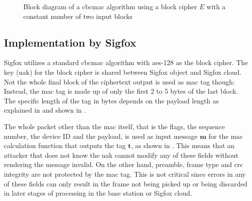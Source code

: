 \begin{figure}[h]
	\centering
	\caption{Block diagram of a \gls{cbcmac} algorithm using a block cipher $E$ with a constant number of two input blocks}
	\label{fig:cbcmac}
\end{figure}

\subsection{Implementation by Sigfox}
\label{sec:ul_mac_realization}
Sigfox utilizes a standard \gls{cbcmac} algorithm with \gls{aes}-128 as the block cipher.
The key (\gls{nak}) for the block cipher is shared between Sigfox object and Sigfox cloud.
Not the whole final block of the ciphertext output is used as \gls{mac} tag though: Instead, the \gls{mac} tag is made up of only the first 2 to 5 bytes of the last block.
The specific length of the tag in bytes depends on the payload length as explained in  and shown in .

The whole packet other than the \gls{mac} itself, that is the flags, the sequence number, the device ID and the payload, is used as input message $\mathbf m$ for the \gls{mac} calculation function that outputs the tag $\mathbf t$, as shown in .
This means that an attacker that does not know the \gls{nak} cannot modify any of these fields without rendering the message invalid.
On the other hand, preamble, frame type and \gls{crc} integrity are not protected by the \gls{mac} tag.
This is not critical since errors in any of these fields can only result in the frame not being picked up or being discarded in later stages of processing in the base station or Sigfox cloud.

